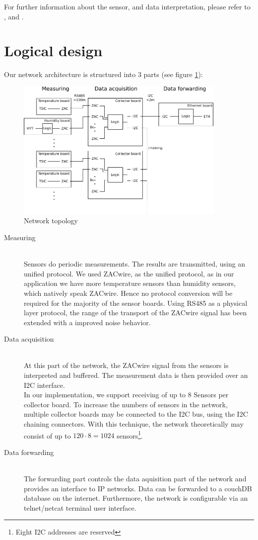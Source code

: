 \documentclass[a4paper]{scrreprt}
\begin{document}
For further information about the sensor, and data interpretation, please refer to \cite{hyt}, \cite{hyt3} and \cite{hyt2}.
\section{Logical design}
Our network architecture is structured into 3 parts (see figure \ref{fig:topo}):
\begin{figure}[Hh!]
	\centering
	\includegraphics[width=0.9\textwidth]{img/plan2.pdf}
	\caption{Network topology}
	\label{fig:topo}
\end{figure}
\begin{description}
  \item[Measuring]\hfill \\
    Sensors do periodic measurements. The results are transmitted,
    using an unified protocol. We used ZACwire, as the unified
    protocol, as in our application we have more temperature sensors
    than humidity sensors, which natively speak ZACwire. Hence no
    protocol conversion will be required for the majority of the
    sensor boards. 
    Using RS485 as a physical layer protocol, the range of the transport of the ZACwire signal has been extended with a improved noise behavior.
  \item[Data acquisition]\hfill \\
    At this part of the network, the ZACwire signal from the sensors
    is interpreted and buffered. The measurement data is then
    provided over an I2C interface.\\
    In our implementation, we support receiving of up to 8 Sensors
    per collector board. To increase the numbers of sensors in the
    network, multiple collector boards may be connected to the I2C
    bus, using the I2C chaining connectors. With this technique,
    the network theoretically may consist of up to
    $120\cdot 8 = 1024$ sensors\footnote{Eight I2C addresses are reserved}.
  \item[Data forwarding]\hfill \\
    The forwarding part controls the data aquisition part of the
    network and provides an interface to IP networks. Data can be
    forwarded to a couchDB database on the internet. Furthermore, the network 
    is configurable via an telnet/netcat terminal user interface.
\end{description}
\end{document}
